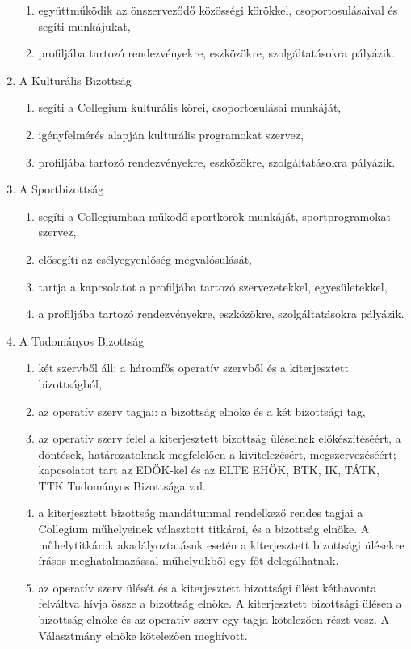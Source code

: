 \documentclass{../styles/rulebook}
\begin{document}
\begin{enumerate}
\begin{enumerate}
		\item együttműködik az önszerveződő közösségi körökkel, csoportosulásaival és segíti munkájukat,
		\item profiljába tartozó rendezvényekre, eszközökre, szolgáltatásokra pályázik.
	\end{enumerate}
	\item A Kulturális Bizottság
	\begin{enumerate}
		\item segíti a Collegium kulturális körei, csoportosulásai munkáját,
		\item igényfelmérés alapján kulturális programokat szervez,
		\item profiljába tartozó rendezvényekre, eszközökre, szolgáltatásokra pályázik.
	\end{enumerate}
	\item A Sportbizottság
	\begin{enumerate}
		\item segíti a Collegiumban működő sportkörök munkáját, sportprogramokat szervez,
		\item elősegíti az esélyegyenlőség megvalósulását,
		\item tartja a kapcsolatot a profiljába tartozó szervezetekkel, egyesületekkel,
		\item a profiljába tartozó rendezvényekre, eszközökre, szolgáltatásokra pályázik.
	\end{enumerate}
	\item A Tudományos Bizottság
	\begin{enumerate}
		\item két szervből áll: a háromfős operatív szervből és a kiterjesztett bizottságból,
		\item az operatív szerv tagjai: a bizottság elnöke és a két bizottsági tag,
		\item az operatív szerv felel a kiterjesztett bizottság üléseinek előkészítéséért, a döntések, határozatoknak megfelelően a kivitelezésért, megszervezéséért; kapcsolatot tart az EDÖK-kel és az ELTE EHÖK, BTK, IK, TÁTK, TTK Tudományos Bizottságaival.
		\item a kiterjesztett bizottság mandátummal rendelkező rendes tagjai a Collegium műhelyeinek választott titkárai, és a bizottság elnöke. A műhelytitkárok akadályoztatásuk esetén a kiterjesztett bizottsági ülésekre írásos meghatalmazással műhelyükből egy főt delegálhatnak.
		\item az operatív szerv ülését és a kiterjesztett bizottsági ülést kéthavonta felváltva hívja össze a bizottság elnöke. A kiterjesztett bizottsági ülésen a bizottság elnöke és az operatív szerv egy tagja kötelezően részt vesz. A Választmány elnöke kötelezően meghívott.

\end{enumerate}
\end{enumerate}
\end{document}
